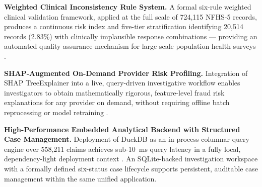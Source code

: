 \textbf{Weighted Clinical Inconsistency Rule System.} A formal six-rule weighted clinical validation framework, applied at the full scale of 724,115 NFHS-5 records, produces a continuous risk index and five-tier stratification identifying 20,514 records (2.83\%) with clinically implausible response combinations --- providing an automated quality assurance mechanism for large-scale population health surveys \cite{b14}\cite{b15}.

\textbf{SHAP-Augmented On-Demand Provider Risk Profiling.} Integration of SHAP TreeExplainer \cite{b6} into a live, query-driven investigative workflow enables investigators to obtain mathematically rigorous, feature-level fraud risk explanations for any provider on demand, without requiring offline batch reprocessing or model retraining \cite{b7}\cite{b8}.

\textbf{High-Performance Embedded Analytical Backend with Structured Case Management.} Deployment of DuckDB as an in-process columnar query engine over 558,211 claims achieves sub-10~ms query latency in a fully local, dependency-light deployment context \cite{b18}. An SQLite-backed investigation workspace with a formally defined six-status case lifecycle supports persistent, auditable case management within the same unified application.
